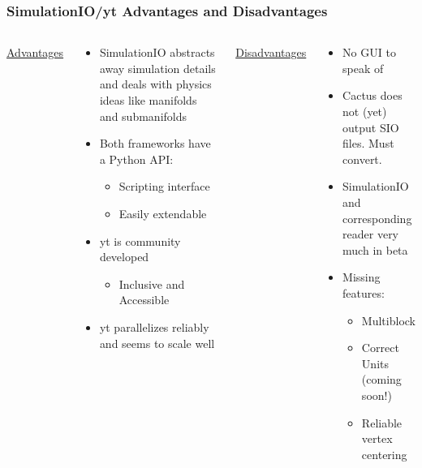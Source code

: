 \documentclass[]{beamer}
\begin{document}
\begin{frame}
  \frametitle{SimulationIO/yt Advantages and Disadvantages}
  \begin{columns}
    \column{6cm}
    \underline{\color{green}\huge Advantages}
    \begin{large}
      \begin{itemize}
      \item SimulationIO abstracts away simulation details and deals with physics ideas like manifolds and submanifolds
      \item Both frameworks have a Python API:
        \begin{itemize}
        \item Scripting interface
        \item Easily extendable
        \end{itemize}
      \item yt is community developed
        \begin{itemize}
        \item Inclusive and Accessible
        \end{itemize}
      \item yt parallelizes reliably and seems to scale well
      \end{itemize}
    \end{large}
    \column{6cm}
    \underline{\color{red}\huge Disadvantages}
    \begin{large}
      \begin{itemize}
      \item No GUI to speak of
      \item Cactus does not (yet) output SIO files. Must convert.
      \item SimulationIO and corresponding reader very much in beta
      \item Missing features:
        \begin{itemize}
        \item Multiblock
        \item Correct Units (coming soon!)
        \item Reliable vertex centering
        \end{itemize}
      \end{itemize}
    \end{large}
  \end{columns}
\end{frame}
\end{document}
